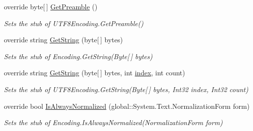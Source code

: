\begin{DoxyCompactItemize}
override byte\mbox{[}$\,$\mbox{]} \hyperlink{class_system_1_1_text_1_1_fakes_1_1_stub_u_t_f8_encoding_a396cdb674f257a99c9d31c7d2e894bf0}{Get\-Preamble} ()
\begin{DoxyCompactList}\small\item\em Sets the stub of U\-T\-F8\-Encoding.\-Get\-Preamble()\end{DoxyCompactList}\item 
override string \hyperlink{class_system_1_1_text_1_1_fakes_1_1_stub_u_t_f8_encoding_a67797fdb4e7e714474c85a229148bd2a}{Get\-String} (byte\mbox{[}$\,$\mbox{]} bytes)
\begin{DoxyCompactList}\small\item\em Sets the stub of Encoding.\-Get\-String(\-Byte\mbox{[}$\,$\mbox{]} bytes)\end{DoxyCompactList}\item 
override string \hyperlink{class_system_1_1_text_1_1_fakes_1_1_stub_u_t_f8_encoding_a9a3addf72d6a956e203f1f3289530ac5}{Get\-String} (byte\mbox{[}$\,$\mbox{]} bytes, int \hyperlink{jquery-1_810_82-vsdoc_8js_a75bb12d1f23302a9eea93a6d89d0193e}{index}, int count)
\begin{DoxyCompactList}\small\item\em Sets the stub of U\-T\-F8\-Encoding.\-Get\-String(\-Byte\mbox{[}$\,$\mbox{]} bytes, Int32 index, Int32 count)\end{DoxyCompactList}\item 
override bool \hyperlink{class_system_1_1_text_1_1_fakes_1_1_stub_u_t_f8_encoding_a7f0145ba7a35f0a03a060246eb42f2a0}{Is\-Always\-Normalized} (global\-::\-System.\-Text.\-Normalization\-Form form)
\begin{DoxyCompactList}\small\item\em Sets the stub of Encoding.\-Is\-Always\-Normalized(\-Normalization\-Form form)\end{DoxyCompactList}\end{DoxyCompactItemize}
